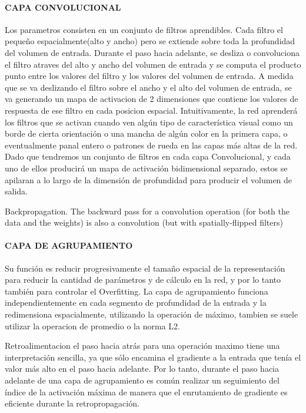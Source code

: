 \documentclass[a4paper,10pt]{article}
\begin{document}
      \paragraph{CAPA CONVOLUCIONAL} 
	Los parametros consisten en un conjunto de filtros aprendibles. Cada filtro el pequeño espacialmente(alto y ancho) pero se extiende sobre toda la profundidad del volumen de entrada.
	Durante el paso hacia adelante, se desliza o convoluciona el filtro atraves del alto y ancho del volumen de entrada y se computa el producto punto entre los valores del filtro y los valores
	del volumen de entrada. A medida que se va deslizando el filtro sobre el ancho y el alto del volumen de entrada, se va generando un mapa de activacion de 2 dimensiones que contiene los 
	valores de respuesta de ese filtro en cada posicion espacial.
	Intuitivamente, la red aprenderá los filtros que se activan cuando ven algún tipo de característica visual como un borde de cierta orientación o una mancha de algún color en la 
	primera capa, o eventualmente panal entero o patrones de rueda en las capas más altas de la red. Dado que tendremos un conjunto de filtros en cada capa Convolucional, 
	y cada uno de ellos producirá un mapa de activación bidimensional separado, estos se apilaran a lo largo de la dimensión de profundidad para producir el volumen de salida.

	Backpropagation. The backward pass for a convolution operation (for both the data and the weights) is also a convolution (but with spatially-flipped filters)

      \paragraph{CAPA DE AGRUPAMIENTO} 
	Su función es reducir progresivamente el tamaño espacial de la representación para reducir la cantidad de parámetros y de cálculo en la red, y por lo tanto también para controlar
	el Overfitting. La capa de agrupamiento funciona independientemente en cada segmento de profundidad de la entrada y la redimensiona espacialmente, utilizando la operación de máximo, 
	tambien se suele utilizar la operacion de promedio o la norma L2.

	Retroalimentacion
	el paso hacia atrás para una operación maximo tiene una interpretación sencilla, ya que sólo encamina el gradiente a la entrada que tenía el valor más alto en el paso hacia
	adelante. Por lo tanto, durante el paso hacia adelante de una capa de agrupamiento es común realizar un seguimiento del índice de la activación máxima de manera que 
	el enrutamiento de gradiente es eficiente durante la retropropagación.
\end{document}
